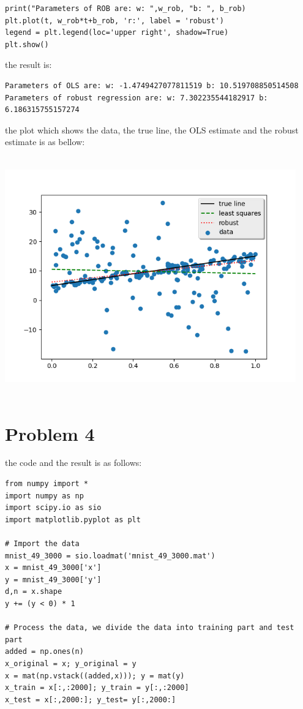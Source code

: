 \documentclass[letterpaper,11pt]{article}
\begin{document}
\begin{spacing}{1.2}
\begin{lstlisting}
print("Parameters of ROB are: w: ",w_rob, "b: ", b_rob)
plt.plot(t, w_rob*t+b_rob, 'r:', label = 'robust')
legend = plt.legend(loc='upper right', shadow=True)
plt.show()
\end{lstlisting}
the result is:
\begin{lstlisting}
Parameters of OLS are: w: -1.4749427077811519 b: 10.519708850514508
Parameters of robust regression are: w: 7.302235544182917 b: 6.186315755157274
\end{lstlisting}
the plot which shows the data, the true line, the OLS estimate and the robust estimate is as bellow:

\includegraphics[width=4.95in,height=4.05in]{Robust_Regression.png}

\section*{Problem 4}

the code and the result is as follows:
\begin{lstlisting}
from numpy import *
import numpy as np
import scipy.io as sio
import matplotlib.pyplot as plt

# Import the data
mnist_49_3000 = sio.loadmat('mnist_49_3000.mat')
x = mnist_49_3000['x']
y = mnist_49_3000['y']
d,n = x.shape
y += (y < 0) * 1

# Process the data, we divide the data into training part and test part
added = np.ones(n)
x_original = x; y_original = y
x = mat(np.vstack((added,x))); y = mat(y)
x_train = x[:,:2000]; y_train = y[:,:2000]
x_test = x[:,2000:]; y_test= y[:,2000:]


\end{lstlisting}
\end{spacing}
\end{document}
